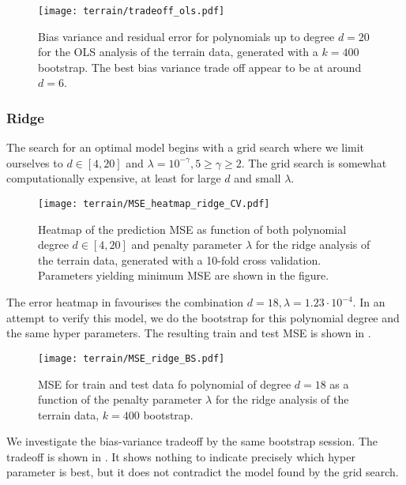         \begin{figure}
            \texttt{[image: terrain/tradeoff\_ols.pdf]}
            \caption{Bias variance and residual error for polynomials up to degree $d=20$ for the OLS analysis of the terrain data, generated with a $k=400$ bootstrap. The best bias variance trade off appear to be at around $d=6$.}
            \label{fig:gc_bias_variance_ols}
        \end{figure}


        \subsubsection{Ridge}\label{sec:gc_ridgeanalysis}


        The search for an optimal model begins with a grid search where we limit ourselves to $d\in[4, 20]$ and $\lambda=10^{-\gamma}, 5 \geq \gamma \geq 2$. The grid search is somewhat computationally expensive, at least for large $d$ and small $\lambda$.
        
        \begin{figure}
            \texttt{[image: terrain/MSE\_heatmap\_ridge\_CV.pdf]}
            \caption{Heatmap of the prediction MSE as function of both polynomial degree $d\in[4,20]$ and penalty parameter $\lambda$ for the ridge analysis of the terrain data, generated with a 10-fold cross validation. Parameters yielding minimum MSE are shown in the figure. }
            \label{fig:gc_gridsearch_ridge}
        \end{figure}

        The error heatmap in  favourises the combination $d=18, \lambda = 1.23\cdot 10^{-4}$. In an attempt to verify this model, we do the bootstrap for this polynomial degree and the same hyper parameters. The resulting train and test MSE is shown in .

        \begin{figure}
            \texttt{[image: terrain/MSE\_ridge\_BS.pdf]}
            \caption{MSE for train and test data fo polynomial of degree $d=18$ as a function of the penalty parameter $\lambda$ for the ridge analysis of the terrain data, $k=400$ bootstrap. }
            \label{fig:gc_model_complexity_ridge}
        \end{figure}

        We investigate the bias-variance tradeoff by the same bootstrap session. The tradeoff is shown in . It shows nothing to indicate precisely which hyper parameter is best, but it does not contradict the model found by the grid search.

